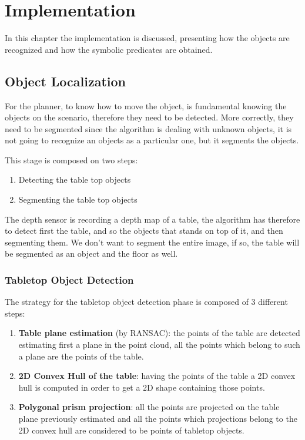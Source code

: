 \chapter{Implementation}
\label{ch:implementation}

In this chapter the implementation is discussed, presenting how the objects are recognized and how the symbolic predicates are obtained. 

\section{Object Localization} 
For the planner, to know how to move the object, is fundamental knowing the objects on the scenario, therefore they need to be detected. More correctly, they need to be segmented since the algorithm is dealing with unknown objects, it is not going to recognize an objects as a particular one, but it segments the objects. 

This stage is composed on two steps:
\begin{enumerate}
\item Detecting the table top objects
\item Segmenting the table top objects
\end{enumerate}
The depth sensor is recording a depth map of a table, the algorithm has therefore to detect first the table, and so the objects that stands on top of it, and then segmenting them. We don't want to segment the entire image, if so, the table will be segmented as an object and the floor as well.

\subsection{Tabletop Object Detection} 
The strategy for the tabletop object detection phase is composed of 3 different steps:
\begin{enumerate}
\item \textbf{Table plane estimation} (by RANSAC): the points of the table are detected estimating first a plane in the point cloud, all the points which belong to such a plane are the points of the table. 
\item \textbf{2D Convex Hull of the table}: having the points of the table a 2D convex hull is computed in order to get a 2D shape containing those points.
\item \textbf{Polygonal prism projection}: all the points are projected on the table plane previously estimated and all the points which projections belong to the 2D convex hull are considered to be points of tabletop objects. 
\end{enumerate}

